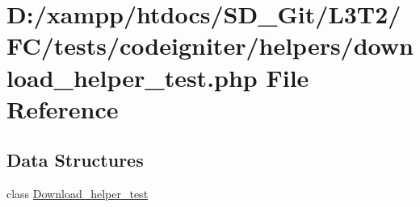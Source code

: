 \hypertarget{download__helper__test_8php}{}\section{D\+:/xampp/htdocs/\+S\+D\+\_\+\+Git/\+L3\+T2/\+F\+C/tests/codeigniter/helpers/download\+\_\+helper\+\_\+test.php File Reference}
\label{download__helper__test_8php}
\subsection*{Data Structures}
\begin{DoxyCompactItemize}
\item 
class \hyperlink{class_download__helper__test}{Download\+\_\+helper\+\_\+test}
\end{DoxyCompactItemize}
